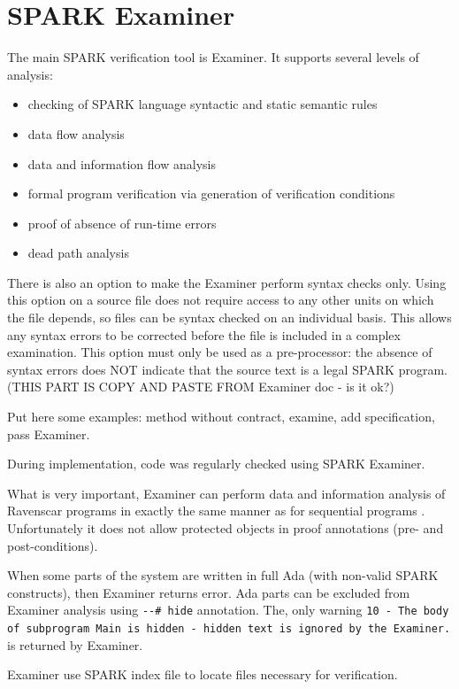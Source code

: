 \section{SPARK Examiner}
\label{verification:examiner}

The main SPARK verification tool is Examiner. It supports several levels of analysis:
\begin{itemize}
	\item checking of SPARK language syntactic and static semantic rules
	\item data flow analysis
	\item data and information flow analysis
	\item formal program verification via generation of verification conditions
	\item proof of absence of run-time errors
	\item dead path analysis
\end{itemize}

There is also an option to make the Examiner perform syntax checks only. Using this option on a source file does not require access to any other units on which the file depends, so files can be syntax checked on an individual basis. This allows any syntax errors to be corrected before the file is included in a complex examination.  This option must only be used as a pre-processor: the absence of syntax errors does NOT indicate that the source text is a legal SPARK program. \cite{Examiner:Online} (THIS PART IS COPY AND PASTE FROM Examiner doc - is it ok?)

Put here some examples: method without contract, examine, add specification, pass Examiner.

During implementation, code was regularly checked using SPARK Examiner.

What is very important, Examiner can perform data and information analysis of Ravenscar programs in exactly the same manner as for sequential programs \cite{Ravenscar:Online}. Unfortunately it does not allow protected objects in proof annotations (pre- and post-conditions).

When some parts of the system are written in full Ada (with non-valid SPARK constructs), then Examiner returns error. Ada parts can be excluded from Examiner analysis using \lstinline{--# hide} annotation. The, only warning \lstinline{10 - The body of subprogram Main is hidden - hidden text is ignored by the Examiner.} is returned by Examiner.

Examiner use SPARK index file to locate files necessary for verification. \cite{Barnes:Book}

